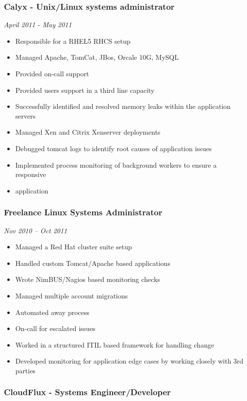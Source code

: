 \subsubsection{Calyx - Unix/Linux systems administrator}

\emph{April 2011 - May 2011}

\begin{itemize}
\item
  Responsible for a RHEL5 RHCS setup
\item
  Managed Apache, TomCat, JBos, Orcale 10G, MySQL
\item
  Provided on-call support
\item
  Provided users support in a third line capacity
\item
  Successfully identified and resolved memory leaks within the
  application servers
\item
  Managed Xen and Citrix Xenserver deployments
\item
  Debugged tomcat logs to identify root causes of application issues
\item
  Implemented process monitoring of background workers to ensure a
  responsive
\item
  application
\end{itemize}
\subsubsection{Freelance Linux Systems Administrator}

\emph{Nov 2010 -- Oct 2011}

\begin{itemize}
\item
  Managed a Red Hat cluster suite setup
\item
  Handled custom Tomcat/Apache based applications
\item
  Wrote NimBUS/Nagios based monitoring checks
\item
  Managed multiple account migrations
\item
  Automated away process
\item
  On-call for escalated issues
\item
  Worked in a structured ITIL based framework for handling change
\item
  Developed monitoring for application edge cases by working closely
  with 3rd parties
\end{itemize}
\subsubsection{CloudFlux - Systems Engineer/Developer}

